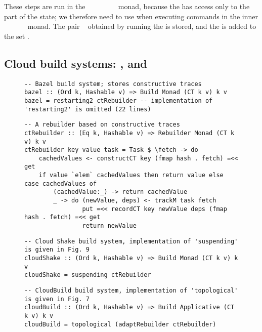 These steps are run in the
~~~~~~~~
monad, because the  has access only to the~ part of the state;
we therefore need to use  when executing commands in the inner
~~~~~~ monad.
The pair ~ obtained by running the  is
stored, and the  is added to the set .

\subsection{Cloud build systems: \Bazel, \CloudBuild and \Cloud \Shake}\label{sec-implementation-cloud}

\begin{figure}
\begin{verbatim}
-- Bazel build system; stores constructive traces
bazel :: (Ord k, Hashable v) => Build Monad (CT k v) k v
bazel = restarting2 ctRebuilder -- implementation of 'restarting2' is omitted (22 lines)
\end{verbatim}
\vspace{1mm}
\begin{verbatim}
-- A rebuilder based on constructive traces
ctRebuilder :: (Eq k, Hashable v) => Rebuilder Monad (CT k v) k v
ctRebuilder key value task = Task $ \fetch -> do
    cachedValues <- constructCT key (fmap hash . fetch) =<< get
    if value `elem` cachedValues then return value else case cachedValues of
        (cachedValue:_) -> return cachedValue
        _ -> do (newValue, deps) <- trackM task fetch
                put =<< recordCT key newValue deps (fmap hash . fetch) =<< get
                return newValue
\end{verbatim}
\vspace{1mm}
\begin{verbatim}
-- Cloud Shake build system, implementation of 'suspending' is given in Fig. 9
cloudShake :: (Ord k, Hashable v) => Build Monad (CT k v) k v
cloudShake = suspending ctRebuilder
\end{verbatim}
\vspace{1mm}
\begin{verbatim}
-- CloudBuild build system, implementation of 'topological' is given in Fig. 7
cloudBuild :: (Ord k, Hashable v) => Build Applicative (CT k v) k v
cloudBuild = topological (adaptRebuilder ctRebuilder)

\end{verbatim}
\end{figure}
